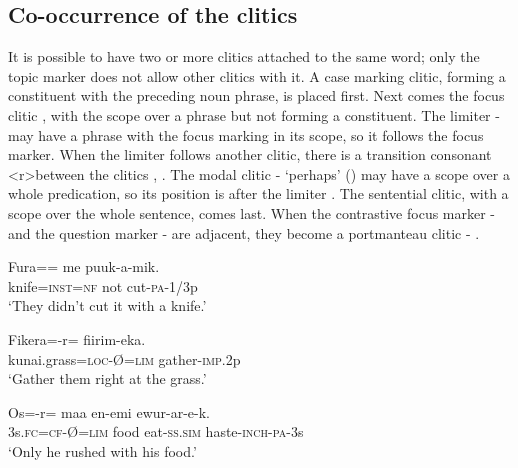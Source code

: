 \subsection{Co-occurrence of the clitics}\label{sec:3.12.9}
{}
It is possible to have two or more clitics attached to the same word; only the topic marker does not allow other clitics with it. A case marking clitic, forming a constituent with the preceding noun phrase, is placed first. Next comes the focus clitic , with the scope over a phrase but not forming a constituent. The limiter \nobreakdash- may have a phrase with the focus marking in its scope, so it follows the focus marker. When the limiter follows another clitic, there is a transition consonant <r>between the clitics , . The modal clitic \nobreakdash- `perhaps' () may have a scope over a whole predication, so its position is after the limiter . The sentential clitic, with a scope over the whole sentence, comes last. When the contrastive focus marker - and the question marker - are adjacent, they become a portmanteau clitic - .

\ea%
\label{ex:3:x792}
\gll Fura== me puuk-a-mik. \\
knife=\textsc{inst}=\textsc{nf} not cut-\textsc{pa}-1/3p\\
\glt`They didn't cut it with a knife.'
\z

\ea%
\label{ex:3:x795}
\gll Fikera=-r= fiirim-eka. \\
kunai.grass=\textsc{loc}-{\O}=\textsc{lim} gather-\textsc{imp}.2p\\
\glt`Gather them right at the  grass.'
\z

\ea%
\label{ex:3:x796}
\gll Os=-r= maa en-emi ewur-ar-e-k. \\
3s.\textsc{fc}=\textsc{cf}-{\O}=\textsc{lim} food eat-\textsc{ss}.\textsc{sim} haste-\textsc{inch}-\textsc{pa}-3s\\
\glt`Only he rushed with his food.'
\z

